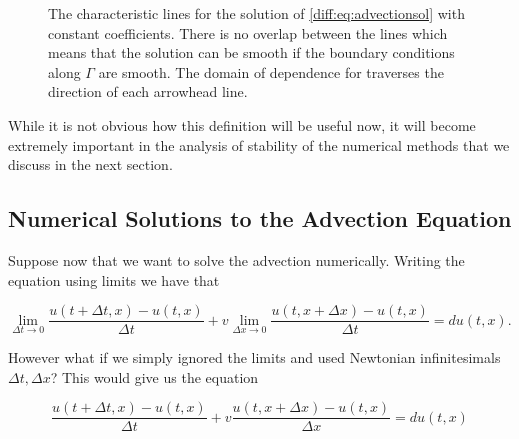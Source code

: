 \documentclass[../main.tex]{subfiles}
\begin{document}
  \begin{figure}[hbt]
    \centering

    \caption{The characteristic lines for the solution of \autoref{diff:eq:advectionsol} with constant coefficients. There is no overlap between the lines which means that the solution can be smooth if the boundary conditions along $\Gamma$ are smooth. The domain of dependence for traverses the direction of each arrowhead line. \label{diff:fig:domainofdep}}
  \end{figure}

  While it is not obvious how this definition will be useful now, it will become extremely important in the analysis of stability of the numerical methods that we discuss in the next section.

  \subsection{Numerical Solutions to the Advection Equation} \label{diff:sec:fdesintro}
  Suppose now that we want to solve the advection numerically. Writing the equation using limits we have that

  \begin{equation} \label{diff:eq:finiteadvection}
    \lim_{\Delta t \to 0} \frac{u(t + \Delta t, x) - u(t, x)}{\Delta t} + v \lim_{\Delta x \to 0} \frac{u(t, x + \Delta x) - u(t, x)}{\Delta t} = d u(t, x).
  \end{equation}

  However what if we simply ignored the limits and used Newtonian infinitesimals $\Delta t, \Delta x$? This would give us the equation

  \begin{equation} \label{diff:eq:advectionfde}
    \frac{u(t + \Delta t, x) - u(t, x)}{\Delta t} + v \frac{u(t, x + \Delta x) - u(t, x)}{\Delta x} = d u(t, x)
  \end{equation}
\end{document}
